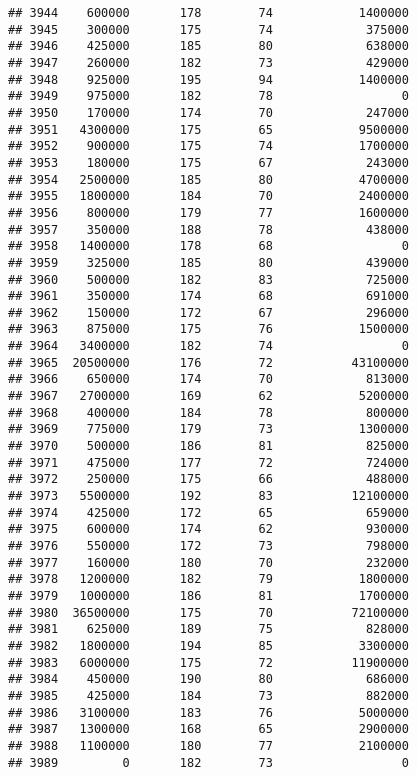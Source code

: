 \documentclass[
]{article}
\begin{document}
\begin{verbatim}
## 3944    600000       178        74            1400000
## 3945    300000       175        74             375000
## 3946    425000       185        80             638000
## 3947    260000       182        73             429000
## 3948    925000       195        94            1400000
## 3949    975000       182        78                  0
## 3950    170000       174        70             247000
## 3951   4300000       175        65            9500000
## 3952    900000       175        74            1700000
## 3953    180000       175        67             243000
## 3954   2500000       185        80            4700000
## 3955   1800000       184        70            2400000
## 3956    800000       179        77            1600000
## 3957    350000       188        78             438000
## 3958   1400000       178        68                  0
## 3959    325000       185        80             439000
## 3960    500000       182        83             725000
## 3961    350000       174        68             691000
## 3962    150000       172        67             296000
## 3963    875000       175        76            1500000
## 3964   3400000       182        74                  0
## 3965  20500000       176        72           43100000
## 3966    650000       174        70             813000
## 3967   2700000       169        62            5200000
## 3968    400000       184        78             800000
## 3969    775000       179        73            1300000
## 3970    500000       186        81             825000
## 3971    475000       177        72             724000
## 3972    250000       175        66             488000
## 3973   5500000       192        83           12100000
## 3974    425000       172        65             659000
## 3975    600000       174        62             930000
## 3976    550000       172        73             798000
## 3977    160000       180        70             232000
## 3978   1200000       182        79            1800000
## 3979   1000000       186        81            1700000
## 3980  36500000       175        70           72100000
## 3981    625000       189        75             828000
## 3982   1800000       194        85            3300000
## 3983   6000000       175        72           11900000
## 3984    450000       190        80             686000
## 3985    425000       184        73             882000
## 3986   3100000       183        76            5000000
## 3987   1300000       168        65            2900000
## 3988   1100000       180        77            2100000
## 3989         0       182        73                  0

\end{verbatim}
\end{document}
